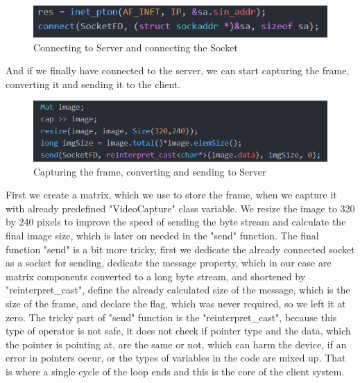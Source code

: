 \documentclass[conference]{IEEEtran}
\begin{document}
\begin{figure}[h!]
	\includegraphics[width=\linewidth]{ClientCodeExample3.png}
	\caption{Connecting to Server and connecting the Socket}
	\label{fig:CCE3}
\end{figure}
\newline
And if we finally have connected to the server, we can start capturing the frame, converting it and sending it to the client.
\begin{figure}[h!]
	\includegraphics[width=\linewidth]{ClientCodeExample4.png}
	\caption{Capturing the frame, converting and sending to Server}
	\label{fig:CCE4}
\end{figure}
First we create a matrix, which we use to store the frame, when we capture it with already predefined "VideoCapture" class variable. We resize the image to 320 by 240 pixels to improve the speed of sending the byte stream and calculate the final image size, which is later on needed in the "send" function. The final function "send" is a bit more tricky, first we dedicate the already connected socket as a socket for sending, dedicate the message property, which in our case are matrix components converted to a long byte stream, and shortened by "reinterpret\_cast", define the already calculated size of the message, which is the size of the frame, and declare the flag, which was never required, so we left it at zero. The tricky part of "send" function is the "reinterpret\_cast", because this type of operator is not safe, it does not check if pointer type and the data, which the pointer is pointing at, are the same or not, which can harm the device, if an error in pointers occur, or the types of variables in the code are mixed up.
\newline
That is where a single cycle of the loop ends and this is the core of the client system.
\end{document}
